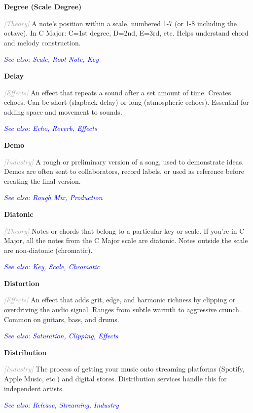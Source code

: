 \documentclass[11pt,letterpaper]{article}
\newcommand{\term}[1]{\textbf{\large\color{purple}#1}}
\newcommand{\category}[1]{\textcolor{darkgray}{\textit{\small [#1]}}}
\newcommand{\seealso}[1]{\textcolor{blue}{\textit{See also: #1}}}
\newenvironment{termdef}[1]
  {\noindent\term{#1}\par\nopagebreak}
  {\par\vspace{0.3em}}
\begin{document}
\begin{termdef}{Degree (Scale Degree)}
\category{Theory}
A note's position within a scale, numbered 1-7 (or 1-8 including the octave). In C Major: C=1st degree, D=2nd, E=3rd, etc. Helps understand chord and melody construction.

\seealso{Scale, Root Note, Key}
\end{termdef}

\begin{termdef}{Delay}
\category{Effects}
An effect that repeats a sound after a set amount of time. Creates echoes. Can be short (slapback delay) or long (atmospheric echoes). Essential for adding space and movement to sounds.

\seealso{Echo, Reverb, Effects}
\end{termdef}

\begin{termdef}{Demo}
\category{Industry}
A rough or preliminary version of a song, used to demonstrate ideas. Demos are often sent to collaborators, record labels, or used as reference before creating the final version.

\seealso{Rough Mix, Production}
\end{termdef}

\begin{termdef}{Diatonic}
\category{Theory}
Notes or chords that belong to a particular key or scale. If you're in C Major, all the notes from the C Major scale are diatonic. Notes outside the scale are non-diatonic (chromatic).

\seealso{Key, Scale, Chromatic}
\end{termdef}

\begin{termdef}{Distortion}
\category{Effects}
An effect that adds grit, edge, and harmonic richness by clipping or overdriving the audio signal. Ranges from subtle warmth to aggressive crunch. Common on guitars, bass, and drums.

\seealso{Saturation, Clipping, Effects}
\end{termdef}

\begin{termdef}{Distribution}
\category{Industry}
The process of getting your music onto streaming platforms (Spotify, Apple Music, etc.) and digital stores. Distribution services handle this for independent artists.

\seealso{Release, Streaming, Industry}
\end{termdef}
\end{document}
